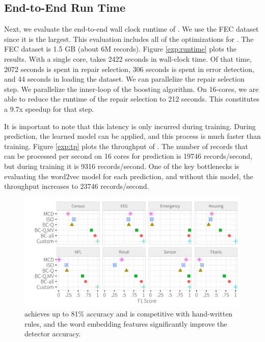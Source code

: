 \subsection{End-to-End Run Time}
Next, we evaluate the end-to-end wall clock runtime of \sys. We use the FEC dataset since it is the largest. This evaluation includes all of the optimizations for \sys. The FEC dataset is 1.5 GB (about 6M records). 
Figure \ref{exp:runtime} plots the results.
With a single core, \sys takes 2422 seconds in wall-clock time. Of that time, 2072 seconds is spent in repair selection, 306 seconds is spent in error detection, and 44 seconds in loading the dataset.
We can parallelize the repair selection step. We parallelize the inner-loop of the boosting algorithm. On 16-cores, we are able to reduce the runtime of the repair selection to 212 seconds. This constitutes a 9.7x speedup for that step.

It is important to note that this latency is only incurred during training. During prediction, the learned model can be applied, and this process is much faster than training. 
Figure \ref{exp:tp} plots the throughput of \sys.
The number of records that can be processed per second on 16 cores for prediction is 19746 records/second, but during training it is 9316 records/second. One of the key bottlenecks is evaluating the word2vec model for each prediction, and without this model, the throughput increases to 23746 records/second.

\begin{figure}[t]
\centering
 \includegraphics[width=\columnwidth]{exp/daccuracy.png}
 \caption{ \sys achieves up to 81\% accuracy and is competitive with hand-written rules, and the word embedding features significantly improve the detector accuracy.
 \label{fig:derror}}
\end{figure}

